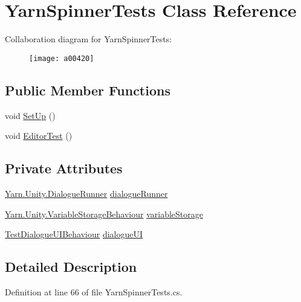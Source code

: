 \hypertarget{a00200}{\section{Yarn\-Spinner\-Tests Class Reference}
\label{a00200}
}


Collaboration diagram for Yarn\-Spinner\-Tests\-:
\nopagebreak
\begin{figure}[H]
\begin{center}
\leavevmode
\texttt{[image: a00420]}
\end{center}
\end{figure}
\subsection*{Public Member Functions}
\begin{DoxyCompactItemize}
\item 
void \hyperlink{a00200_ad6e4c6a92bb5ed6187949264df6aaf1b}{Set\-Up} ()
\item 
void \hyperlink{a00200_a60ab8ed8dc30ec30e74baa1916d47324}{Editor\-Test} ()
\end{DoxyCompactItemize}
\subsection*{Private Attributes}
\begin{DoxyCompactItemize}
\item 
\hyperlink{a00095}{Yarn.\-Unity.\-Dialogue\-Runner} \hyperlink{a00200_a9791840e0b5987e5bd09bce83ce2d8d9}{dialogue\-Runner}
\item 
\hyperlink{a00193}{Yarn.\-Unity.\-Variable\-Storage\-Behaviour} \hyperlink{a00200_a27dbc8c3f7f23ce142d1d5d1fd3df8bc}{variable\-Storage}
\item 
\hyperlink{a00173}{Test\-Dialogue\-U\-I\-Behaviour} \hyperlink{a00200_aace025d2a9a703154a1989c47b0a0737}{dialogue\-U\-I}
\end{DoxyCompactItemize}


\subsection{Detailed Description}


Definition at line 66 of file Yarn\-Spinner\-Tests.\-cs.



